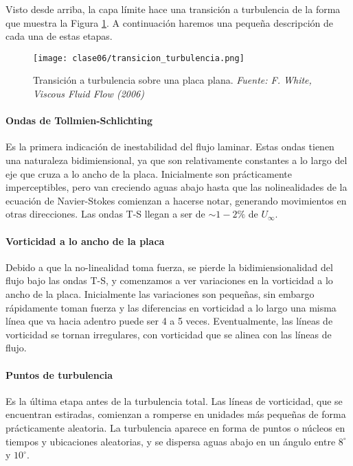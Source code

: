 Visto desde arriba, la capa límite hace una transición a turbulencia de la forma que muestra la Figura \ref{fig:transicion_turbulencia}.
A continuación haremos una pequeña descripción de cada una de estas etapas.
%
\begin{figure}[h!]
\centering
\texttt{[image: clase06/transicion\_turbulencia.png]}
\caption{Transición a turbulencia sobre una placa plana. \emph{Fuente: F. White, Viscous Fluid Flow (2006)}}
\label{fig:transicion_turbulencia}
\end{figure}

\paragraph*{Ondas de Tollmien-Schlichting}
Es la primera indicación de inestabilidad del flujo laminar. 
Estas ondas tienen una naturaleza bidimiensional, ya que son relativamente constantes a lo largo del eje que cruza a lo ancho de la placa.
Inicialmente son prácticamente imperceptibles, pero van creciendo aguas abajo hasta que las nolinealidades de la ecuación de Navier-Stokes comienzan a hacerse notar, generando movimientos en otras direcciones.
Las ondas T-S llegan a ser de $\sim 1-2\%$ de $U_\infty$.

\paragraph*{Vorticidad a lo ancho de la placa}
Debido a que la no-linealidad toma fuerza, se pierde la bidimiensionalidad del flujo bajo las ondas T-S, y comenzamos a ver variaciones en la vorticidad a lo ancho de la placa.
Inicialmente las variaciones son pequeñas, sin embargo rápidamente toman fuerza y las diferencias en vorticidad a lo largo una misma línea que va hacia adentro puede ser 4 a 5 veces.
Eventualmente, las líneas de vorticidad se tornan irregulares, con vorticidad que se alinea con las líneas de flujo.

\paragraph*{Puntos de turbulencia}
Es la última etapa antes de la turbulencia total.
Las líneas de vorticidad, que se encuentran estiradas, comienzan a romperse en unidades más pequeñas de forma prácticamente aleatoria. 
La turbulencia aparece en forma de puntos o núcleos en tiempos y ubicaciones aleatorias, y se dispersa aguas abajo en un ángulo entre $8^\circ$ y $10^\circ$.

